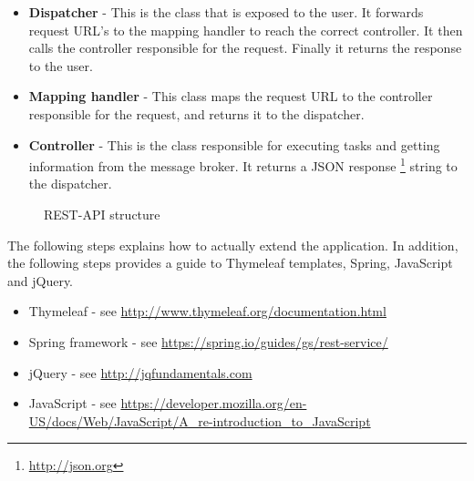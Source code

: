 \begin{itemize}
    \item\textbf{Dispatcher} -  This is the class that is exposed to the user. It forwards request URL's to the mapping handler to reach the correct controller. It then calls the controller responsible for the request. Finally it returns the response to the user. 
    \item\textbf{Mapping handler} - This class maps the request URL to the controller responsible for the request, and returns it to the dispatcher. 
    \item\textbf{Controller} - This is the class responsible for executing tasks and getting information from the message broker. It returns a JSON response \footnote{\url{http://json.org}} string to the dispatcher.  
\end{itemize}

\clearpage

\begin{center}
  \begin{figure}[ht!]
    \caption{REST-API structure}
    \label{fig:spring}
  \end{figure}
\end{center}

The following steps explains how to actually extend the application. In addition, the following steps provides a guide to Thymeleaf templates, Spring, JavaScript and jQuery. 

\begin{itemize}
\setlength{\itemsep}{0cm}%
\item Thymeleaf - see \url{http://www.thymeleaf.org/documentation.html}
\item Spring framework - see \url{https://spring.io/guides/gs/rest-service/}
\item jQuery - see \url{http://jqfundamentals.com}
\item JavaScript - see \url{https://developer.mozilla.org/en-US/docs/Web/JavaScript/A_re-introduction_to_JavaScript}
\end{itemize}

